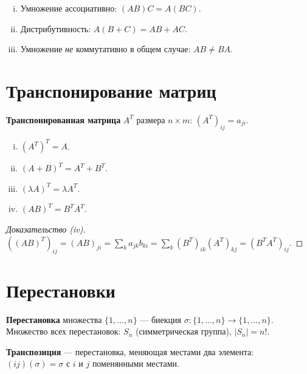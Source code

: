 \documentclass[12pt]{article}
\begin{document}
\begin{property}
\begin{enumerate}[(i)]
\item Умножение ассоциативно: $(AB)C = A(BC)$.
\item Дистрибутивность: $A(B+C) = AB + AC$.
\item Умножение \emph{не} коммутативно в общем случае: $AB \neq BA$.
\end{enumerate}
\end{property}

\section{Транспонирование матриц}

\begin{definition}
\textbf{Транспонированная матрица} $A^T$ размера $n \times m$:
$(A^T)_{ij} = a_{ji}$.
\end{definition}

\begin{property}
\begin{enumerate}[(i)]
\item $(A^T)^T = A$.
\item $(A + B)^T = A^T + B^T$.
\item $(\lambda A)^T = \lambda A^T$.
\item $(AB)^T = B^T A^T$.
\end{enumerate}
\end{property}

\begin{proof}[Доказательство (iv)]
$((AB)^T)_{ij} = (AB)_{ji} = \sum_k a_{jk}b_{ki}
= \sum_k (B^T)_{ik}(A^T)_{kj} = (B^T A^T)_{ij}$.
\end{proof}

\section{Перестановки}

\begin{definition}
\textbf{Перестановка} множества $\{1,\ldots,n\}$ --- биекция
$\sigma\colon \{1,\ldots,n\} \to \{1,\ldots,n\}$.
Множество всех перестановок: $S_n$ (симметрическая группа), $|S_n| = n!$.
\end{definition}

\begin{definition}
\textbf{Транспозиция} --- перестановка, меняющая местами два элемента:
$(ij)(\sigma) = \sigma$ с $i$ и $j$ поменянными местами.
\end{definition}
\end{document}
